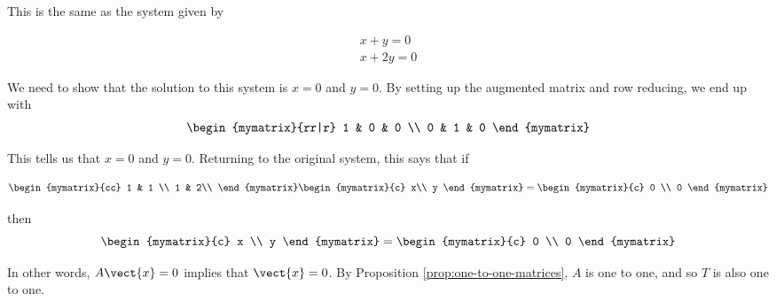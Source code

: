 \begin{solution}
This is the same as the system given by

\begin{equation*}
\begin{array}{c}
x + y = 0 \\
x + 2y = 0
\end{array}
\end{equation*}

We need to show that the solution to this system is $x = 0$ and $y = 0$. By setting up the augmented matrix and row reducing, we end up with
\begin{equation*} \begin{mymatrix}{rr|r}
1 & 0 & 0 \\
0 & 1 & 0
\end{mymatrix}
\end{equation*}

This tells us that $x = 0$ and $y = 0$. Returning to the original system, this says that if 

\begin{equation*}
\begin{mymatrix}{cc}
1 & 1 \\
1 & 2\\
\end{mymatrix}
\begin{mymatrix}{c}
x\\
y
\end{mymatrix}
=
\begin{mymatrix}{c}
0 \\
0
\end{mymatrix}
\end{equation*}

then 
\begin{equation*}
\begin{mymatrix}{c}
x \\
y
\end{mymatrix}
=
\begin{mymatrix}{c}
0 \\
0
\end{mymatrix}
\end{equation*}

In other words, $A\vect{x}=0$ implies that $\vect{x}=0$. By 
Proposition \ref{prop:one-to-one-matrices}, $A$ is one to one, and so $T$ is also one to one.


\end{solution}
